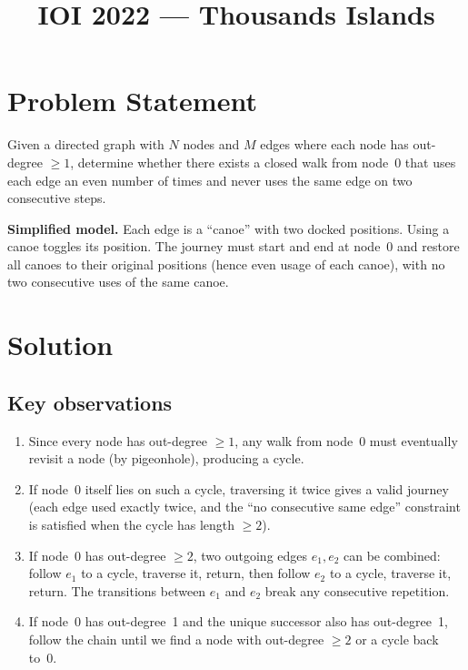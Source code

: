 \documentclass[11pt,a4paper]{article}
\title{IOI 2022 --- Thousands Islands}
\author{}
\date{}
\begin{document}
\maketitle

\section{Problem Statement}

Given a directed graph with $N$ nodes and $M$ edges where each node has
out-degree $\ge 1$, determine whether there exists a closed walk from
node~0 that uses each edge an even number of times and never uses the
same edge on two consecutive steps.

\medskip
\noindent\textbf{Simplified model.}  Each edge is a ``canoe'' with two
docked positions.  Using a canoe toggles its position.  The journey
must start and end at node~0 and restore all canoes to their original
positions (hence even usage of each canoe), with no two consecutive
uses of the same canoe.

\section{Solution}

\subsection{Key observations}

\begin{enumerate}
  \item Since every node has out-degree $\ge 1$, any walk from node~0
        must eventually revisit a node (by pigeonhole), producing a
        cycle.
  \item If node~0 itself lies on such a cycle, traversing it twice
        gives a valid journey (each edge used exactly twice, and the
        ``no consecutive same edge'' constraint is satisfied when the
        cycle has length $\ge 2$).
  \item If node~0 has out-degree $\ge 2$, two outgoing edges $e_1, e_2$
        can be combined: follow $e_1$ to a cycle, traverse it,
        return, then follow $e_2$ to a cycle, traverse it, return.
        The transitions between $e_1$ and $e_2$ break any consecutive
        repetition.
  \item If node~0 has out-degree~1 and the unique successor also has
        out-degree~1, follow the chain until we find a node with
        out-degree $\ge 2$ or a cycle back to~0.
\end{enumerate}
\end{document}
